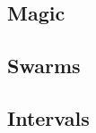 \begin{multicols}{2}


\commonArmourChart

\mentalSkillChart

\subsubsection*{}


\subsection*{Magic}



\subsection*{Swarms}



\subsection*{Intervals}



\end{multicols}

